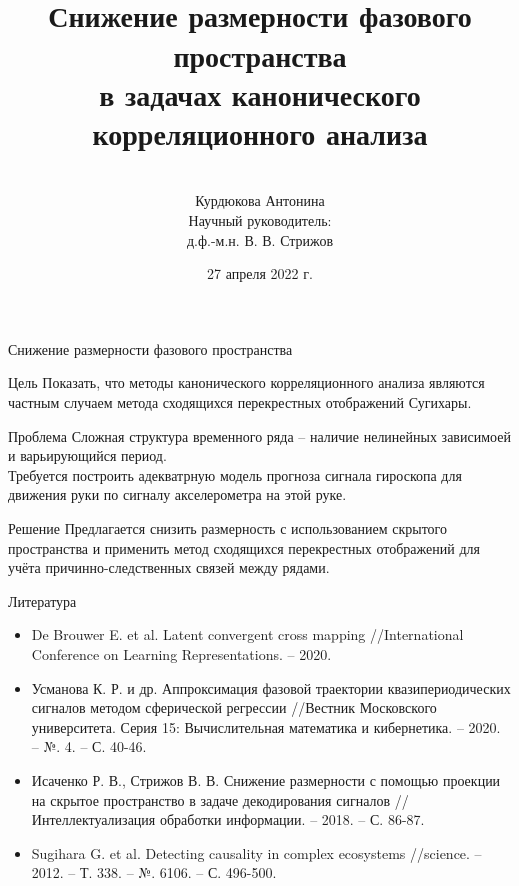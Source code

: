 \documentclass[9pt]{beamer}
\title[\hbox to 56mm{  \hfill\insertframenumber\,/\,\inserttotalframenumber}]
{\\ \vspace{1.5cm} Снижение размерности фазового пространства \\ в задачах канонического корреляционного анализа}
\author[Курдюкова Антонина]{\\ 
	\vspace{.4cm}
	Курдюкова Антонина\\
	\vspace{3mm}
	{\footnotesize Научный руководитель: \\
	д.ф.-м.н. В. В. Стрижов}}
\institute[МФТИ(НИУ)]{
Московский физико-технический институт\\
Факультет управления и прикладной математики\\
Кафедра <<Интеллектуальные системы>>}
\date{27 апреля 2022 г.}
\begin{document}
\begin{frame}
\titlepage
\end{frame}
\begin{frame}{Снижение размерности фазового пространства}
	\begin{block}{Цель}
		Показать, что методы канонического корреляционного анализа являются частным случаем метода сходящихся перекрестных отображений Сугихары.
	\end{block}
	\begin{block}{Проблема}
		Сложная структура временного ряда -- наличие нелинейных зависимоей и варьирующийся период. \\
		Требуется построить адекватрную модель прогноза сигнала гироскопа для движения руки по сигналу акселерометра на этой руке.
	\end{block}
	\begin{block}{Решение}
		 Предлагается снизить размерность с использованием скрытого пространства и применить метод сходящихся перекрестных отображений для учёта причинно-следственных связей между рядами. 
	\end{block}
\end{frame}
\begin{frame}{Литература}
	\begin{itemize}
		\item De Brouwer E. et al. Latent convergent cross mapping //International Conference on Learning Representations. – 2020.
		\vfill
		\item Усманова К. Р. и др. Аппроксимация фазовой траектории квазипериодических сигналов методом сферической регрессии //Вестник Московского университета. Серия 15: Вычислительная математика и кибернетика. – 2020. – №. 4. – С. 40-46.
		\vfill
		\item Исаченко Р. В., Стрижов В. В. Снижение размерности с помощью проекции на скрытое пространство в задаче декодирования сигналов //Интеллектуализация обработки информации. – 2018. – С. 86-87.
		\vfill
		\item Sugihara G. et al. Detecting causality in complex ecosystems //science. – 2012. – Т. 338. – №. 6106. – С. 496-500.
		
	\end{itemize}
\end{frame}
\end{document}
